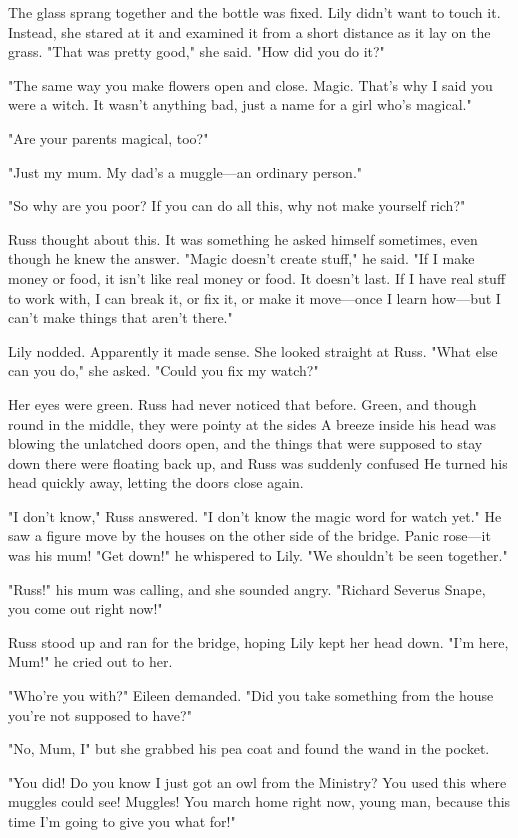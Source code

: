 The glass sprang together and the bottle was fixed. Lily didn't want to touch it. Instead, she stared at it and examined it from a short distance as it lay on the grass. "That was pretty good," she said. "How did you do it?"

"The same way you make flowers open and close. Magic. That's why I said you were a witch. It wasn't anything bad, just a name for a girl who's magical."

"Are your parents magical, too?"

"Just my mum. My dad's a muggle—an ordinary person."

"So why are you poor? If you can do all this, why not make yourself rich?"

Russ thought about this. It was something he asked himself sometimes, even though he knew the answer. "Magic doesn't create stuff," he said. "If I make money or food, it isn't like real money or food. It doesn't last. If I have real stuff to work with, I can break it, or fix it, or make it move—once I learn how—but I can't make things that aren't there."

Lily nodded. Apparently it made sense. She looked straight at Russ. "What else can you do," she asked. "Could you fix my watch?"

Her eyes were green. Russ had never noticed that before. Green, and though round in the middle, they were pointy at the sides{\el} A breeze inside his head was blowing the unlatched doors open, and the things that were supposed to stay down there were floating back up, and Russ was suddenly confused{\el} He turned his head quickly away, letting the doors close again.

"I don't know," Russ answered. "I don't know the magic word for watch yet." He saw a figure move by the houses on the other side of the bridge. Panic rose—it was his mum! "Get down!" he whispered to Lily. "We shouldn't be seen together."

"Russ!" his mum was calling, and she sounded angry. "Richard Severus Snape, you come out right now!"

Russ stood up and ran for the bridge, hoping Lily kept her head down. "I'm here, Mum!" he cried out to her.

"Who're you with?" Eileen demanded. "Did you take something from the house you're not supposed to have?"

"No, Mum, I{\el}" but she grabbed his pea coat and found the wand in the pocket.

"You did! Do you know I just got an owl from the Ministry? You used this where muggles could see! Muggles! You march home right now, young man, because this time I'm going to give you what for!"

